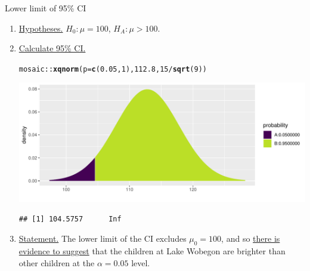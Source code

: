 \documentclass[handout]{beamer}\usepackage[]{graphicx}\usepackage[]{color}
\newcommand{\hlnum}[1]{\textcolor[rgb]{0.686,0.059,0.569}{#1}}%
\newcommand{\hlopt}[1]{\textcolor[rgb]{0,0,0}{#1}}%
\newcommand{\hlstd}[1]{\textcolor[rgb]{0.345,0.345,0.345}{#1}}%
\newcommand{\hlkwc}[1]{\textcolor[rgb]{0.333,0.667,0.333}{#1}}%
\newcommand{\hlkwd}[1]{\textcolor[rgb]{0.737,0.353,0.396}{\textbf{#1}}}%
\newenvironment{knitrout}{}{} %
\begin{document}
\begin{frame}[fragile]{Lower limit of 95\% CI}
\small
	\begin{enumerate}
		\item \underline{Hypotheses.} $H_0: \mu = 100$, $H_A: \mu > 100$.
		\item \underline{Calculate 95\% CI.}
\begin{knitrout}\scriptsize
{}\color{fgcolor}
\begin{alltt}
\hlstd{mosaic}\hlopt{::}\hlkwd{xqnorm}\hlstd{(}\hlkwc{p} \hlstd{=} \hlkwd{c}\hlstd{(}\hlnum{0.05}\hlstd{,}\hlnum{1}\hlstd{),} \hlnum{112.8}\hlstd{,} \hlnum{15}\hlopt{/}\hlkwd{sqrt}\hlstd{(}\hlnum{9}\hlstd{))}
\end{alltt}


{\centering \includegraphics[width=1\linewidth]{figure/unnamed-chunk-16-1} 

}


\begin{verbatim}
## [1] 104.5757      Inf
\end{verbatim}

\end{knitrout}
\pause 
\item \underline{Statement.} The lower limit of the CI excludes $\mu_0=100$, and so \underline{there is evidence to suggest} that the children at Lake Wobegon are brighter than other children at the $\alpha=0.05$ level.
	\end{enumerate}

\end{frame}
\end{document}
